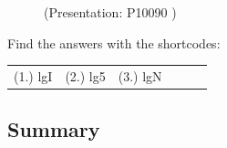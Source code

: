       

    
    \label{m38712*eip-269}
    \setcounter{subfigure}{0}


	\begin{figure}[H] %
    
    \label{m38712*slidesharemedia}\label{m38712*slideshareflash}
             { (Presentation:  P10090 )}
      
      \vspace{2pt}
    \vspace{.1in}
    
    

 \end{figure}   

    \addtocounter{footnote}{-0}
    \par \label{m38712*cid10}
\par {} Find the answers with the shortcodes:
 \par \begin{tabular}[h]{cccccc}
 (1.) lgI  &  (2.) lg5  &  (3.) lgN  & \end{tabular}



            \subsection{ Summary}
            \nopagebreak
            
